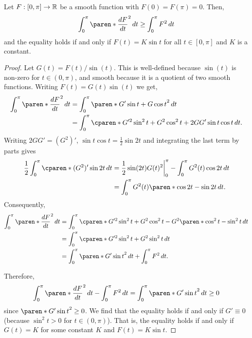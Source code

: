 \documentclass[11pt]{penrose}
\begin{document}
\begin{nthm}
    Let $F : [0, \pi] \to \mathbb{R}$ be a smooth function with $F(0) = F(\pi) = 0$. Then,
    \begin{equation}
        \int_{0}^{\pi} \paren*{\frac{dF}{dt}}^2 \,dt \geq \int_{0}^{\pi} F^2 \,dt
    \end{equation}
    and the equality holds if and only if $F(t) = K \sin t$ for all $t \in [0, \pi]$ and $K$ is a constant.
\end{nthm}
\begin{proof}
    Let $G(t) = F(t) / \sin(t)$. This is well-defined because $\sin(t)$ is non-zero for $t \in (0, \pi)$, and smooth because it is a quotient of two smooth functions. Writing $F(t) = G(t) \sin(t)$ we get,
    \begin{align}
        \int_{0}^{\pi} \paren*{\frac{dF}{dt}}^2 \,dt
        &= \int_{0}^{\pi} \paren*{ G' \sin t + G \cos t }^2 \,dt\\
        &= \int_{0}^{\pi} \cparen*{G'^2 \sin^2 t + G^2 \cos^2 t + 2 G G' \sin t \cos t} \,dt.
    \end{align}
    Writing $2 G G' = (G^2)'$, $\sin t \cos t = \frac{1}{2} \sin 2t$ and integrating the last term by parts gives
    \begin{align}
        \frac{1}{2} \int_{0}^{\pi} \cparen*{(G^2)' \sin 2t} \,dt
        &= \bigg. \frac{1}{2} \sin (2t) G(t)^2 \bigg|_{0}^{\pi} - \int_{0}^{\pi} G^2(t) \cos 2t \,dt\\
        &= \int_{0}^{\pi} G^2(t) \paren*{\cos 2t - \sin 2t} \,dt.
    \end{align}
    Consequently,
    \begin{align}
        \int_{0}^{\pi} \paren*{\frac{dF}{dt}}^2 \,dt
        &= \int_{0}^{\pi} \cparen*{G'^2 \sin^2 t + G^2 \cos^2 t - G^2 \paren*{\cos^2 t - \sin^2 t}} \,dt\\
        &= \int_{0}^{\pi} \cparen*{G'^2 \sin^2 t + G^2 \sin^2 t} \,dt\\
        &= \int_{0}^{\pi} \paren*{G' \sin t}^2 \,dt + \int_{0}^{\pi} F^2 \,dt.
    \end{align}

    Therefore,
    \begin{equation}
        \int_{0}^{\pi} \paren*{\frac{dF}{dt}}^2 \,dt
        - \int_{0}^{\pi} F^2 \,dt
        = \int_{0}^{\pi} \paren*{G' \sin t}^2 \,dt \geq 0
    \end{equation}
    since $\paren*{G' \sin t}^2 \geq 0$. We find that the equality holds if and only if $G' \equiv 0$ (because $\sin^2 t > 0$ for $t \in (0, \pi)$). That is, the equality holds if and only if $G(t) = K$ for some constant $K$ and $F(t) = K \sin t$.
\end{proof}
\end{document}
